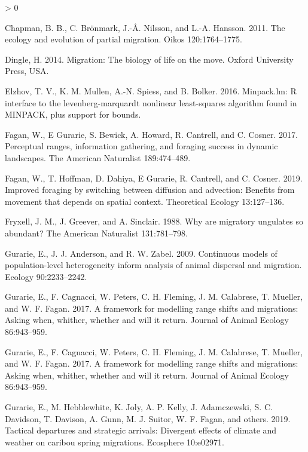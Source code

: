 \documentclass[12pt]{article}
\newlength{\cslhangindent}
\newenvironment{CSLReferences}[2] %
 {%
  \setlength{\parindent}{0pt}
  \ifodd #1 \everypar{\setlength{\hangindent}{\cslhangindent}}\ignorespaces\fi
  \ifnum #2 > 0
  \setlength{\parskip}{#2\baselineskip}
  \fi
 }%
 {}
\begin{document}
\begin{CSLReferences}{1}{0}
\leavevmode\hypertarget{ref-Chapman2011}{}%
Chapman, B. B., C. Brönmark, J.-Å. Nilsson, and L.-A. Hansson. 2011. The
ecology and evolution of partial migration. Oikos 120:1764--1775.

\leavevmode\hypertarget{ref-Dingle2014}{}%
Dingle, H. 2014. Migration: The biology of life on the move. Oxford
University Press, USA.

\leavevmode\hypertarget{ref-minpack.lm}{}%
Elzhov, T. V., K. M. Mullen, A.-N. Spiess, and B. Bolker. 2016.
Minpack.lm: R interface to the levenberg-marquardt nonlinear
least-squares algorithm found in MINPACK, plus support for bounds.

\leavevmode\hypertarget{ref-Fagan2017}{}%
Fagan, W., E Gurarie, S. Bewick, A. Howard, R. Cantrell, and C. Cosner.
2017. Perceptual ranges, information gathering, and foraging success in
dynamic landscapes. The American Naturalist 189:474--489.

\leavevmode\hypertarget{ref-Fagan2019}{}%
Fagan, W., T. Hoffman, D. Dahiya, E Gurarie, R. Cantrell, and C. Cosner.
2019. Improved foraging by switching between diffusion and advection:
Benefits from movement that depends on spatial context. Theoretical
Ecology 13:127--136.

\leavevmode\hypertarget{ref-Fryxell1988}{}%
Fryxell, J. M., J. Greever, and A. Sinclair. 1988. Why are migratory
ungulates so abundant? The American Naturalist 131:781--798.

\leavevmode\hypertarget{ref-Gurarie2009}{}%
Gurarie, E., J. J. Anderson, and R. W. Zabel. 2009. Continuous models of
population-level heterogeneity inform analysis of animal dispersal and
migration. Ecology 90:2233--2242.

\leavevmode\hypertarget{ref-Gurarie2017}{}%
Gurarie, E., F. Cagnacci, W. Peters, C. H. Fleming, J. M. Calabrese, T.
Mueller, and W. F. Fagan. 2017. A framework for modelling range shifts
and migrations: Asking when, whither, whether and will it return.
Journal of Animal Ecology 86:943--959.

\leavevmode\hypertarget{ref-Gurarie2017}{}%
Gurarie, E., F. Cagnacci, W. Peters, C. H. Fleming, J. M. Calabrese, T.
Mueller, and W. F. Fagan. 2017. A framework for modelling range shifts
and migrations: Asking when, whither, whether and will it return.
Journal of Animal Ecology 86:943--959.

\leavevmode\hypertarget{ref-Gurarie2019}{}%
Gurarie, E., M. Hebblewhite, K. Joly, A. P. Kelly, J. Adamczewski, S. C.
Davidson, T. Davison, A. Gunn, M. J. Suitor, W. F. Fagan, and others.
2019. Tactical departures and strategic arrivals: Divergent effects of
climate and weather on caribou spring migrations. Ecosphere 10:e02971.


\end{CSLReferences}
\end{document}
